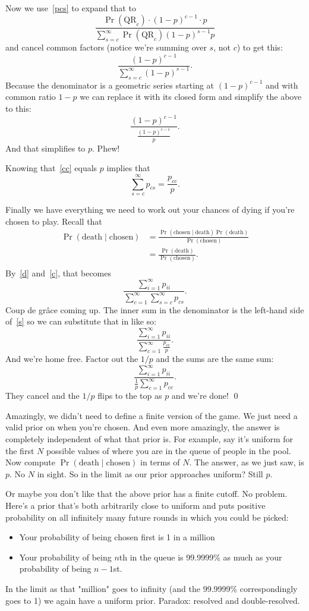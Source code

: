 \documentclass[article,twocolumn]{memoir}
\begin{document}
Now we use~\eqref{pcs} to expand that to
$$
\frac{\Pr(\text{QR}_c)\cdot(1-p)^{c-1}\cdot p}{\sum\limits_{s=c}^\infty \Pr(\text{QR}_c)(1-p)^{s-1} p}
$$
and cancel common factors (notice we're summing over $s$, not $c$) to get this:
$$
\frac{(1-p)^{c-1}}{\sum\limits_{s=c}^\infty (1-p)^{s-1}}.
$$
Because the denominator is a geometric series starting at $(1-p)^{c-1}$ and with common ratio $1-p$ we can replace it with its closed form and simplify the above to this:
$$
\frac{(1-p)^{c-1}}{\frac{(1-p)^{c-1}}{p}}.
$$
And that simplifies to $p$.
Phew!

Knowing that~\eqref{cc} equals $p$ implies that
\begin{equation}\label{s}
\sum\limits_{s=c}^\infty p_{cs} = \frac{p_{cc}}{p}.
\end{equation}

Finally we have everything we need to work out your chances of dying if you're chosen to play.
Recall that
\begin{align*}
\Pr(\text{death} \mid \text{chosen}) 
& = \frac{\Pr(\text{chosen} \mid \text{death}) \Pr(\text{death})}{\Pr(\text{chosen})} \\
& = \frac{\Pr(\text{death})}{\Pr(\text{chosen})}. \\
\end{align*}
By~\eqref{d} and~\eqref{c}, that becomes
$$
\frac{\sum\limits_{i=1}^\infty p_{ii}}{\sum\limits_{c=1}^\infty\sum\limits_{s=c}^\infty p_{cs}}.
$$
Coup de gr\^ace coming up.
The inner sum in the denominator is the left-hand side of~\eqref{s} so we can substitute that in like so:
$$
\frac{\sum\limits_{i=1}^\infty p_{ii}}{\sum\limits_{c=1}^\infty\frac{p_{cc}}{p}}.
$$
And we're home free.
Factor out the $1/p$ and the sums are the same sum:
$$
\frac{\sum\limits_{i=1}^\infty p_{ii}}{\frac{1}{p}\sum\limits_{c=1}^\infty p_{cc}}.
$$
They cancel and the $1/p$ flips to the top as $p$ and we're done! \qed

Amazingly, we didn't need to define a finite version of the game.
We just need a valid prior on when you're chosen.
And even more amazingly, the answer is completely independent of what that prior is.
For example, say it's uniform for the first $N$ possible values of where you are in the queue of people in the pool.
Now compute $\Pr(\text{death}\mid\text{chosen})$ in terms of $N$.
The answer, as we just saw, is $p$.
No $N$ in sight.
So in the limit as our prior approaches uniform?
Still $p$.

Or maybe you don't like that the above prior has a finite cutoff.
No problem.
Here's a prior that's both arbitrarily close to uniform and puts positive probability on all infinitely many future rounds in which you could be picked:
\begin{itemize}
\item Your probability of being chosen first is 1 in a million
\item Your probability of being $n$th in the queue is 99.9999\% as much as your probability of being $n-1$st.
\end{itemize}
In the limit as that "million" goes to infinity (and the 99.9999\% correspondingly goes to 1) we again have a uniform prior.
Paradox: resolved and double-resolved.
\end{document}
